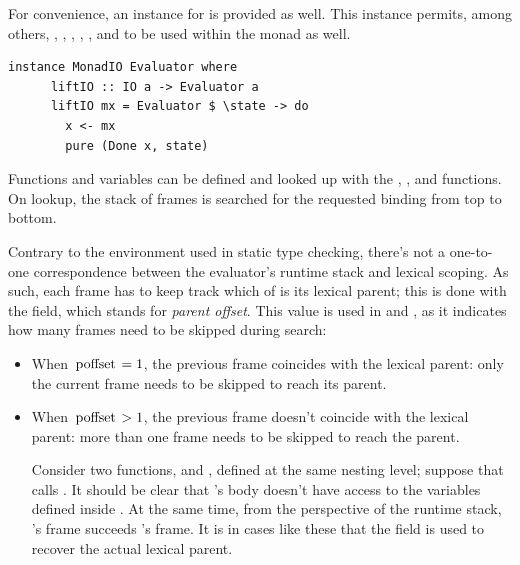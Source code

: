 \documentclass[UdineBachThesis,american,11pt]{PhdThesis}
\begin{document}
  For convenience, an instance for \lstinline@MonadIO@ is provided as well. This
  instance permits, among others, \lstinline@newRef@, \lstinline@readRef@,
  \lstinline@writeRef@, \lstinline@cloneRef@, \lstinline@compareRefs@,
  \lstinline@cloneVals@ and \lstinline@compareVals@ to be used within the
  \lstinline@Evaluator@ monad as well.

  \newpage

  \begin{lstlisting}[gobble=4,basicstyle=\ttfamily\small]
    instance MonadIO Evaluator where
      liftIO :: IO a -> Evaluator a
      liftIO mx = Evaluator $ \state -> do
        x <- mx
        pure (Done x, state)
  \end{lstlisting}

  Functions and variables can be defined and looked up with the
  \lstinline@defineFun@, \lstinline@lookupFun@, \lstinline@defineVar@ and
  \lstinline@lookupVar@ functions. On lookup, the stack of frames is searched
  for the requested binding from top to bottom.

  Contrary to the environment used in static type checking, there's not a
  one-to-one correspondence between the evaluator's runtime stack and lexical
  scoping. As such, each frame has to keep track which of is its lexical parent;
  this is done with the \lstinline@poffset@ field, which stands for \emph{parent
  offset}. This value is used in \lstinline@lookupFun@ and
  \lstinline@lookupVar@, as it indicates how many frames need to be skipped
  during search:

  \begin{itemize}
    \item When $\text{\lstinline@poffset@} = 1$, the previous frame coincides
    with the lexical parent: only the current frame needs to be skipped to reach
    its parent.

    \item When $\text{\lstinline@poffset@} > 1$, the previous frame doesn't
    coincide with the lexical parent: more than one frame needs to be skipped to
    reach the parent.

    Consider two functions, \lstinline@f@ and \lstinline@g@, defined at the same
    nesting level; suppose that \lstinline@f@ calls \lstinline@g@. It should be
    clear that \lstinline@g@'s body doesn't have access to the variables defined
    inside \lstinline@f@. At the same time, from the perspective of the runtime
    stack, \lstinline@g@'s frame succeeds \lstinline@f@'s frame. It is in cases
    like these that the \lstinline@poffset@ field is used to recover the actual
    lexical parent.
  \end{itemize}
\end{document}
